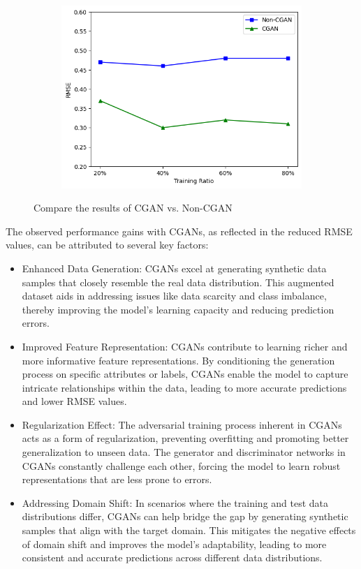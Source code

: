 \documentclass[]{article}
\begin{document}
\begin{figure}[!htbp]
	\centering
	\begin{subfigure}[b]{0.495\textwidth}
		\centering
		\includegraphics[width=\textwidth]{fig/compare_without_include_CGAN.png}
		\label{fig4:image1}
	\end{subfigure}
	\hfill
	\caption{Compare the results of CGAN vs. Non-CGAN}
	\label{fig4}
\end{figure}

The observed performance gains with CGANs, as reflected in the reduced RMSE values, can be attributed to several key factors:

\begin{itemize}
	\item Enhanced Data Generation: CGANs excel at generating synthetic data samples that closely resemble the real data distribution. This augmented dataset aids in addressing issues like data scarcity and class imbalance, thereby improving the model's learning capacity and reducing prediction errors.
	
	\item Improved Feature Representation: CGANs contribute to learning richer and more informative feature representations. By conditioning the generation process on specific attributes or labels, CGANs enable the model to capture intricate relationships within the data, leading to more accurate predictions and lower RMSE values.

	\item Regularization Effect: The adversarial training process inherent in CGANs acts as a form of regularization, preventing overfitting and promoting better generalization to unseen data. The generator and discriminator networks in CGANs constantly challenge each other, forcing the model to learn robust representations that are less prone to errors.

	\item Addressing Domain Shift: In scenarios where the training and test data distributions differ, CGANs can help bridge the gap by generating synthetic samples that align with the target domain. This mitigates the negative effects of domain shift and improves the model's adaptability, leading to more consistent and accurate predictions across different data distributions.
\end{itemize}
\end{document}
